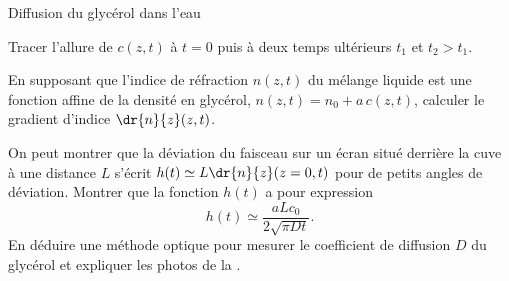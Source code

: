 \begin{exo}[PC][3][TD]{Diffusion du glycérol dans l'eau}
\begin{quest}
\item Tracer l'allure de $c(z,t)$ à $t=0$ puis à deux temps ultérieurs $t_1$ et $t_2>t_1$.
\item En supposant que l'indice de réfraction $n(z,t)$ du mélange liquide est une fonction affine de la densité en glycérol, $n(z,t)=n_0+a\, c(z,t)$, calculer le gradient d'indice $\dr{n}{z}(z,t)$.
\item On peut montrer que la déviation du faisceau sur un écran situé derrière la cuve à une distance $L$ s'écrit $h(t)\simeq L \dr{n}{z}(z=0,t)$ pour de petits angles de déviation. Montrer que la fonction $h(t)$ a pour expression
\begin{equation}
  h(t)\simeq  \frac{aL c_0}{2\sqrt{\pi D t}}.
\end{equation}
En déduire une méthode optique pour mesurer le coefficient de diffusion $D$ du glycérol et expliquer les photos de la .

\end{quest}
\end{exo}
